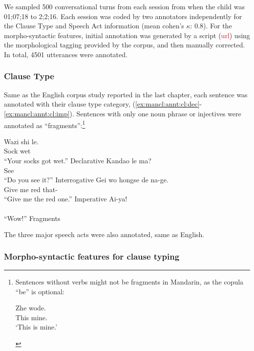 We sampled 500 conversational turns from each session from when the child was 01;07;18 to 2;2;16. Each session was coded by two annotators independently for the Clause Type and Speech Act information (mean cohen's $\kappa$: 0.8). For the morpho-syntactic features, initial annotation was generated by a script (\textcolor{red}{url}) using the morphological tagging provided by the corpus, and then manually corrected. In total, 4501 utterances were annotated. 

\subsubsection{Clause Type}

Same as the English corpus study reported in the last chapter, each sentence was annotated with their clause type category, \diis{} (\ref{ex:mancl:annt:cl:dec}-\ref{ex:mancl:annt:cl:imp}). Sentences with only one noun phrase or injectives were annotated as ``fragments'':\footnote{Sentences without verbs might not be fragments in Mandarin, as the copula  ``be'' is optional:
\begin{xlist}
\ex 
\gll Zhe wode.\\
This mine.\\
\trans `This is mine.'
\end{xlist}
}

\bxl \label{ex:mancl:annt:cl:dec}
\gll Wazi shi le.\\
Sock wet \Sfp{}\\
``Your socks got wet.'' \hfill Declarative
\ex \label{ex:mancl:annt:cl:int}
\gll Kandao le ma?\\
See \Asp{} \Sfp{}\\
\trans``Do you see it?''  \hfill Interrogative
\ex \label{ex:mancl:annt:cl:imp}
\gll Gei wo hongse de na-ge.\\
Give me red  that-\Cl{}\\
\trans``Give me the red one.'' \hfill Imperative
\ex \label{ex:mancl:annt:cl:frag}
\gll Ai-ya!\\
 \\
\trans ``Wow!'' \hfill Fragments
\exl
\eex

The three major speech acts were also annotated, same as English.

\subsubsection{Morpho-syntactic features for clause typing}

